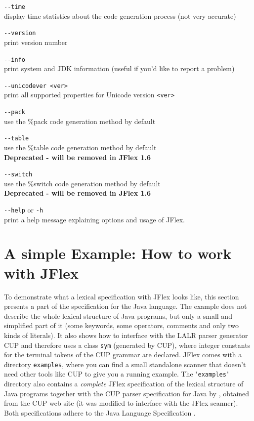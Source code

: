 \documentclass[11pt]{scrartcl}
\newcommand{\trit}{\em}
\newcommand{\nextver}{1.6}
\begin{document}
\begin{description}
\item \verb+--time+\\
  display time statistics about the code generation process
  (not very accurate)

\item \verb+--version+\\
  print version number 

\item \verb+--info+\\
  print system and JDK information (useful if you'd like
  to report a problem)
  
\item \verb+--unicodever <ver>+\\
  print all supported properties for Unicode version \verb+<ver>+

\item \verb+--pack+\\
  use the \%pack code generation method by default

\item \verb+--table+\\
  use the \%table code generation method by default\\
  {\bf Deprecated - will be removed in JFlex \nextver}

\item \verb+--switch+\\
  use the \%switch code generation method by default\\
  {\bf Deprecated - will be removed in JFlex \nextver}

\item \verb+--help+ or \texttt{-h}\\
  print a help message explaining options and usage of JFlex.
\end{description}

\section{A simple Example: How to work with JFlex\label{Example}}
To demonstrate what a lexical specification with JFlex looks like, this
section presents a part of the specification for the Java language.
The example does not describe the whole lexical structure of Java programs,
but only a small and simplified part of it (some keywords, some operators,
comments and only two kinds of literals). It also shows how to interface
with the LALR parser generator CUP \cite{CUP} and therefore
uses a class \texttt{sym} (generated by CUP), where integer constants for
the terminal tokens of the CUP grammar are declared. JFlex comes with a
directory \texttt{examples}, where you can find a small standalone scanner
that doesn't need other tools like CUP to give you a running example.
The "\texttt{examples}" directory also contains a {\trit complete} JFlex 
specification of the lexical structure of Java programs together with the 
CUP parser specification for Java by 
, obtained
from the CUP \cite{CUP} web site (it was modified to interface with the JFlex scanner). 
Both specifications adhere to the Java Language Specification \cite{LangSpec}.
\end{document}
